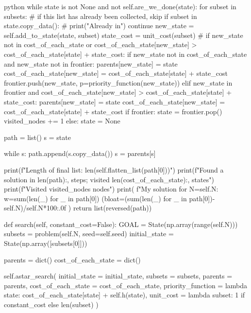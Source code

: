\begin{mintedbox}{python}
          while state is not None and not self.are_we_done(state):
              for subset in subsets:
                  # if this list has already been collected, skip
                  if subset in state.copy_data():
                      # print("Already in")
                      continue
                  new_state = self.add_to_state(state, subset)
                  state_cost = unit_cost(subset)
                  # if new_state not in cost_of_each_state or cost_of_each_state[new_state] > cost_of_each_state[state] + state_cost:
                  if new_state not in cost_of_each_state and new_state not in frontier:
                      parents[new_state] = state
                      cost_of_each_state[new_state] = cost_of_each_state[state] + state_cost
                      frontier.push(new_state, p=priority_function(new_state))
                  elif new_state in frontier and cost_of_each_state[new_state] > cost_of_each_state[state] + state_cost:
                      parents[new_state] = state
                      cost_of_each_state[new_state] = cost_of_each_state[state] + state_cost
              if frontier:
                  state = frontier.pop()
                  visited_nodes += 1
              else:
                  state = None

          path = list()
          s = state

          while s:
              path.append(s.copy_data())
              s = parents[s]

          print(f"Length of final list: {len(self.flatten_list(path[0]))}")
          print(f"Found a solution in {len(path):,} steps; visited {len(cost_of_each_state):,} states")
          print(f"Visited {visited_nodes} nodes")
          print(
              f"My solution for N={self.N}: w={sum(len(_) for _ in path[0])} (bloat={(sum(len(_) for _ in path[0])-self.N)/self.N*100:.0f}%
          )
          return list(reversed(path))

      def search(self, constant_cost=False):
          GOAL = State(np.array(range(self.N)))
          subsets = problem(self.N, seed=self.seed)
          initial_state = State(np.array([subsets[0]]))

          parents = dict()
          cost_of_each_state = dict()

          self.astar_search(
              initial_state = initial_state,
              subsets = subsets,
              parents = parents,
              cost_of_each_state = cost_of_each_state,
              priority_function = lambda state: cost_of_each_state[state] + self.h(state),
              unit_cost = lambda subset: 1 if constant_cost else len(subset)
          )
\end{mintedbox}

